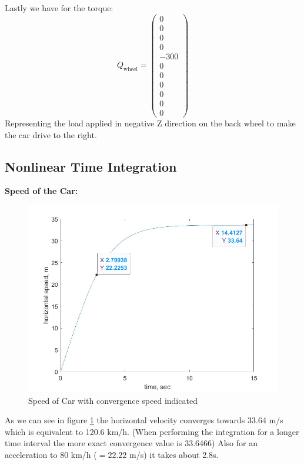 Lastly we have for the torque:
\begin{equation}
    Q_\text{wheel} = 
    \begin{pmatrix}
        0\\
        0\\
        0\\
        0\\
        -300\\
        0\\
        0\\
        0\\
        0\\
        0\\
        0
    \end{pmatrix}
\end{equation}
Representing the load applied in negative Z direction on the back wheel to make the car drive to the right.

\subsection{Nonlinear Time Integration}
\textbf{Speed of the Car:}
\begin{figure}[ht]
    \centering
    \includegraphics[scale=0.4]{images/convergence_speed_of_car.jpg}
    \caption{Speed of Car with convergence speed indicated}
    \label{fig:convergence_speed}
\end{figure}

As we can see in figure \ref{fig:convergence_speed} the horizontal velocity converges towards 33.64 m/s which is equivalent to 120.6 km/h. (When performing the integration for a longer time interval the more exact convergence value is 33.6466) Also for an acceleration to 80 km/h ($= 22.22 $ m/s) it takes about 2.8s.
\clearpage %

